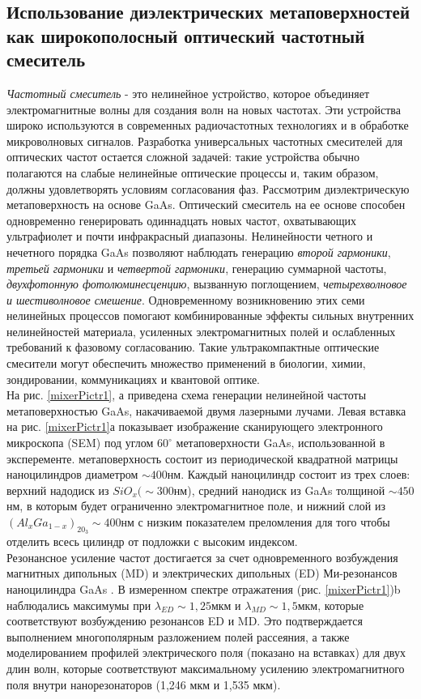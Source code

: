 \subsection*{Использование диэлектрических метаповерхностей как широкополосный оптический частотный смеситель}
\textit{Частотный смеситель} - это нелинейное устройство, которое объединяет электромагнитные волны для создания волн на новых частотах. Эти устройства широко используются в  современных радиочастотных технологиях и в обработке микроволновых сигналов. Разработка универсальных частотных смесителей для оптических частот остается сложной задачей: такие устройства обычно полагаются на слабые нелинейные оптические процессы и, таким образом, должны удовлетворять условиям согласования фаз. Рассмотрим диэлектрическую метаповерхность на основе GaAs. Оптический смеситель на ее основе способен одновременно генерировать одиннадцать новых частот, охватывающих ультрафиолет и почти инфракрасный диапазоны. Нелинейности четного и нечетного порядка GaAs позволяют наблюдать генерацию \textit{второй гармоники}, \textit{третьей гармоники} и \textit{четвертой гармоники}, генерацию суммарной частоты, \textit{двухфотонную фотолюминесценцию}, вызванную поглощением,\textit{ четырехволновое и шестиволновое смешение}. Одновременному возникновению этих семи нелинейных процессов помогают комбинированные эффекты сильных внутренних нелинейностей материала, усиленных электромагнитных полей и ослабленных требований к фазовому согласованию. Такие ультракомпактные оптические смесители могут обеспечить множество применений в биологии, химии, зондировании, коммуникациях и квантовой оптике.
\\
\hspace*{2mm}
На рис. \ref{mixerPictr1}, а приведена схема генерации нелинейной частоты метаповерхностью GaAs, накачиваемой двумя лазерными лучами. Левая вставка на рис. \ref{mixerPictr1}а показывает изображение сканирующего электронного микроскопа (SEM) под углом $60^\circ$ метаповерхности GaAs, использованной в эксперементе. метаповерхность состоит из периодической квадратной матрицы наноцилиндров диаметром $\sim 400$нм. Каждый наноцилиндр состоит из трех слоев: верхний надодиск из $SiO_x (\sim 300 $нм), средний нанодиск из GaAs толщиной $\sim 450$нм, в которым будет ограниченно электромагнитное поле, и нижний слой из $(Al_xGa_{1 - x})_20_3 \sim 400$нм с низким показателем преломления  для того чтобы отделить всесь цилиндр от подложки  с высоким индексом.
\\
\hspace*{2mm}
Резонансное усиление частот достигается за счет одновременного  возбуждения магнитных дипольных (MD) и электрических дипольных (ED) Ми-резонансов наноцилиндра GaAs \cite{liu2016iii}. В измеренном спектре отражатения (рис. \ref{mixerPictr1})b наблюдались максимумы при $\lambda_{ED} \sim 1,25$мкм и $\lambda_{MD} \sim 1,5$мкм, которые соответствуют возбуждению резонансов ED и MD. Это  подтверждается выполнением многополярным разложением полей рассеяния, а также моделированием профилей электрического поля (показано на вставках) для двух длин волн, которые соответствуют максимальному усилению электромагнитного поля внутри нанорезонаторов (1,246 мкм и 1,535 мкм).
